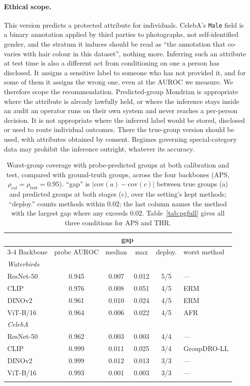 \documentclass[pdflatex,sn-basic]{sn-jnl}%
\theoremstyle{thmstyleone}%
\newcommand{\cov}{\mathrm{cov}}
\newcommand{\auroc}{\mathrm{AUROC}}
\newcommand{\rhocal}{\rho_{\mathrm{cal}}}
\newcommand{\rhotest}{\rho_{\mathrm{test}}}
\begin{document}
\paragraph{Ethical scope.} This version predicts a protected attribute for individuals. CelebA's
\texttt{Male} field is a binary annotation applied by third parties to photographs, not
self-identified gender, and the stratum it induces should be read as ``the annotation that
co-varies with hair colour in this dataset'', nothing more. Inferring such an attribute at test time
is also a different act from conditioning on one a person has disclosed. It assigns a sensitive
label to someone who has not provided it, and for some of them it assigns the wrong one, even at the
$\auroc$ we measure. We therefore scope the recommendation. Predicted-group Mondrian is appropriate where the
attribute is already lawfully held, or where the inference stays inside an audit an operator runs on
their own system and never reaches a per-person decision. It is not appropriate where the inferred
label would be stored, disclosed or used to route individual outcomes. There the true-group version
should be used, with attributes obtained by consent. Regimes
governing special-category data may prohibit the inference outright, whatever its
accuracy.

\begin{table}[t]
\centering
\caption{Worst-group coverage with probe-predicted groups at both calibration and test, compared with ground-truth groups, across the four backbones (APS, $\rhocal{=}\rhotest{=}0.95$). ``gap'' is $|\cov(a)-\cov(c)|$ between true groups (a) and predicted groups at both stages (c), over the setting's kept methods; ``deploy.'' counts methods within $0.02$; the last column names the method with the largest gap where any exceeds $0.02$. Table~\ref{tab:pgfull} gives all three conditions for APS and THR.}
\label{tab:predgroup}
\footnotesize
\setlength{\tabcolsep}{3.5pt}
\begin{tabular}{lccccl}
\toprule
 & & \multicolumn{2}{c}{gap} & & \\
\cmidrule(lr){3-4}
Backbone & probe $\auroc$ & median & max & deploy. & worst method \\
\midrule
\multicolumn{6}{l}{\emph{Waterbirds}} \\
ResNet-50 & 0.945 & 0.007 & 0.012 & 5/5 & --- \\
CLIP & 0.976 & 0.008 & 0.051 & 4/5 & ERM \\
DINOv2 & 0.961 & 0.010 & 0.024 & 4/5 & ERM \\
ViT-B/16 & 0.964 & 0.006 & 0.022 & 4/5 & AFR \\
\midrule
\multicolumn{6}{l}{\emph{CelebA}} \\
ResNet-50 & 0.962 & 0.003 & 0.003 & 4/4 & --- \\
CLIP & 0.999 & 0.011 & 0.025 & 3/4 & GroupDRO-LL \\
DINOv2 & 0.999 & 0.012 & 0.013 & 3/3 & --- \\
ViT-B/16 & 0.993 & 0.001 & 0.003 & 3/3 & --- \\
\botrule
\end{tabular}
\end{table}
\end{document}
